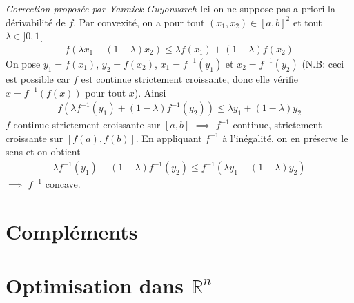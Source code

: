 \documentclass{report}
\begin{document}
\subsection{} \noindent{}\\ 
\\ 
\\
\noindent 
\null \hfill \textit{Correction proposée par Yannick Guyonvarch}\newline
Ici on ne suppose pas a priori la dérivabilité de $f$.
\newline
Par convexité, on a pour tout $(x_1,x_2)\in[a,b]^2$ et tout $\lambda\in]0,1[$
\begin{align*}
    f(\lambda x_1+(1-\lambda)x_2)\leq \lambda f(x_1)+(1-\lambda)f(x_2)
\end{align*}
On pose $y_1=f(x_1)$, $y_2=f(x_2)$, $x_1=f^{-1}(y_1)$ et $x_2=f^{-1}(y_2)$ (N.B: ceci est possible car $f$ est continue strictement croissante, donc elle vérifie $x=f^{-1}(f(x))$ pour tout $x$).
\newline
Ainsi
\begin{align*}
    f(\lambda f^{-1}(y_1)+(1-\lambda)f^{-1}(y_2))\leq \lambda y_1+(1-\lambda)y_2
\end{align*}
$f$ continue strictement croissante sur $[a,b]$ $\implies$ $f^{-1}$ continue, strictement croissante sur $[f(a),f(b)]$. En appliquant $f^{-1}$ à l'inégalité, on en préserve le sens et on obtient
\begin{align*}
    \lambda f^{-1}(y_1)+(1-\lambda)f^{-1}(y_2)\leq f^{-1}(\lambda y_1+(1-\lambda)y_2)
\end{align*}
$\implies$ $f^{-1}$ concave.

\newpage
\section{Compléments}

\newpage
\section{Optimisation dans $\mathbb R^n$}
\end{document}
